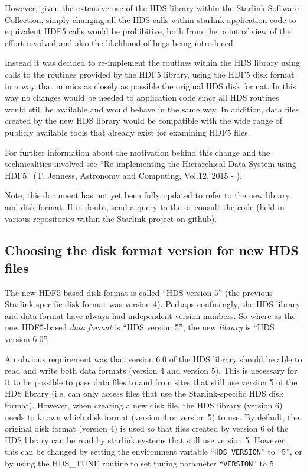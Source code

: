 \documentclass[twoside,11pt]{starlink}
\begin{document}
However, given the extensive use of the HDS library within the Starlink
Software Collection, simply changing all the HDS calls within starlink
application code to equivalent HDF5 calls would be prohibitive, both from
the point of view of the effort involved and also the likelihood of bugs
being introduced.

Instead it was decided to re-implement the routines within the HDS
library using calls to the routines provided by the HDF5 library, using
the HDF5 disk format in a way that mimics as closely as possible the
original HDS disk format. In this way no changes would be needed to
application code since all HDS routines would still be available and
would behave in the same way. In addition, data files created by the new
HDS library would be compatible with the wide range of publicly available
tools that already exist for examining HDF5 files.

For further information about the motivation behind this change and the
technicalities involved see ``Re-implementing the Hierarchical Data System
using HDF5'' (T. Jenness, Astronomy and Computing, Vol.12, 2015 -
).

Note, this document has not yet been fully updated to refer to the new
library and disk format. If in doubt, send a query to the
or consult the code (held in various repositories within the Starlink project
on github).

\subsection{\label{sect:version}Choosing the disk format version for new HDS files}

The new HDF5-based disk format is called ``HDS version 5'' (the previous
Starlink-specific disk format was version 4). Perhaps confusingly, the
HDS library and data format have always had independent version numbers.
So where-as the new HDF5-based \emph{data format} is ``HDS version 5'',
the new \emph{library} is ``HDS version 6.0''.

An obvious requirement was that version 6.0 of the HDS library should be
able to read and write both data formats (version 4 and version 5). This
is necessary for it to be possible to pass data files to and from sites
that still use version 5 of the HDS library (i.e. can only access files
that use the Starlink-specific HDS disk format). However, when creating a new
disk file, the HDS library (version 6) needs to known which disk format
(version 4 or version 5) to use. By default, the original disk format
(version 4) is used so that files created by version 6 of the HDS library
can be read by starlink systems that still use version 5. However, this
can be changed by setting the environment variable ``\texttt{HDS\_VERSION}''
to ``5'', or by using the HDS\_TUNE routine to set tuning parameter
``\texttt{VERSION}'' to 5.
\end{document}
